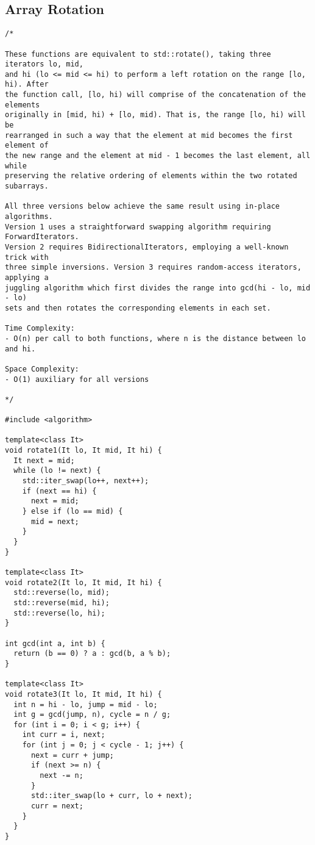 \subsection{Array Rotation}
\begin{lstlisting}
/*

These functions are equivalent to std::rotate(), taking three iterators lo, mid,
and hi (lo <= mid <= hi) to perform a left rotation on the range [lo, hi). After
the function call, [lo, hi) will comprise of the concatenation of the elements
originally in [mid, hi) + [lo, mid). That is, the range [lo, hi) will be
rearranged in such a way that the element at mid becomes the first element of
the new range and the element at mid - 1 becomes the last element, all while
preserving the relative ordering of elements within the two rotated subarrays.

All three versions below achieve the same result using in-place algorithms.
Version 1 uses a straightforward swapping algorithm requiring ForwardIterators.
Version 2 requires BidirectionalIterators, employing a well-known trick with
three simple inversions. Version 3 requires random-access iterators, applying a
juggling algorithm which first divides the range into gcd(hi - lo, mid - lo)
sets and then rotates the corresponding elements in each set.

Time Complexity:
- O(n) per call to both functions, where n is the distance between lo and hi.

Space Complexity:
- O(1) auxiliary for all versions

*/

#include <algorithm>

template<class It>
void rotate1(It lo, It mid, It hi) {
  It next = mid;
  while (lo != next) {
    std::iter_swap(lo++, next++);
    if (next == hi) {
      next = mid;
    } else if (lo == mid) {
      mid = next;
    }
  }
}

template<class It>
void rotate2(It lo, It mid, It hi) {
  std::reverse(lo, mid);
  std::reverse(mid, hi);
  std::reverse(lo, hi);
}

int gcd(int a, int b) {
  return (b == 0) ? a : gcd(b, a % b);
}

template<class It>
void rotate3(It lo, It mid, It hi) {
  int n = hi - lo, jump = mid - lo;
  int g = gcd(jump, n), cycle = n / g;
  for (int i = 0; i < g; i++) {
    int curr = i, next;
    for (int j = 0; j < cycle - 1; j++) {
      next = curr + jump;
      if (next >= n) {
        next -= n;
      }
      std::iter_swap(lo + curr, lo + next);
      curr = next;
    }
  }
}


\end{lstlisting}
